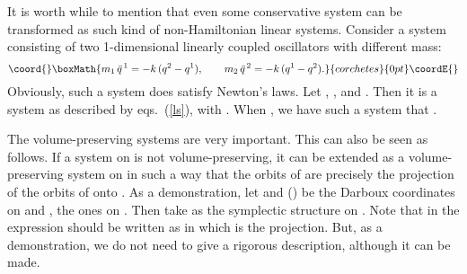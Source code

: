 \documentclass[12pt,a4paper]{article}
\providecommand{\dd}{\mathrm{d}}
\begin{document}
It is worth while to mention that %
even some conservative system can be transformed as such kind of
non-Hamiltonian linear systems. Consider a system consisting of
two 1-dimensional linearly coupled oscillators with different
mass:
\begin{displaymath}\coord{}\boxMath{
  m_1\,\ddot{q}^{\,1} = -k\,(q^2 - q^1), \qquad
  m_2\,\ddot{q}^{\,2} = -k\,(q^1 - q^2).
}{corchetes}{0pt}\coordE{}\end{displaymath}
Obviously, such a system does satisfy Newton's laws. Let \coordHE{}, \coordHE{}, \coordHE{} and \coordHE{}.
Then it is a system as described by eqs.~(\ref{ls}), with \coordHE{}. When \coordHE{}, we have such a system
that \coordHE{}.

The  volume-preserving systems are very important. This can also
be seen as follows. If a system \coordHE{} on \coordHE{}
is not volume-preserving, it can be extended as a
volume-preserving system \coordHE{} on
\coordHE{} in such a way that
the orbits of \coordHE{} are precisely the projection of the orbits of
\coordHE{} onto \coordHE{}. As a demonstration, let \coordHE{} and
\coordHE{} (\coordHE{}) be the Darboux coordinates on
\coordHE{} and \coordHE{}, \coordHE{}  the ones on \coordHE{}.
Then take \myHighlight{$\omega' = \dd p_\mu\wedge \dd q^\mu = \omega + \dd
p_0\wedge\dd q^0,~~\mu=0,1,\cdots, n,$}\coordHE{} as the symplectic structure
on \coordHE{}. Note that \myHighlight{$\omega$}\coordHE{} in the
expression should be written as \myHighlight{$\pi^*\omega$}\coordHE{} in which \coordHE{} is the projection. But, as a demonstration, we
do not need to give a rigorous description, although it can be
made.
\end{document}
